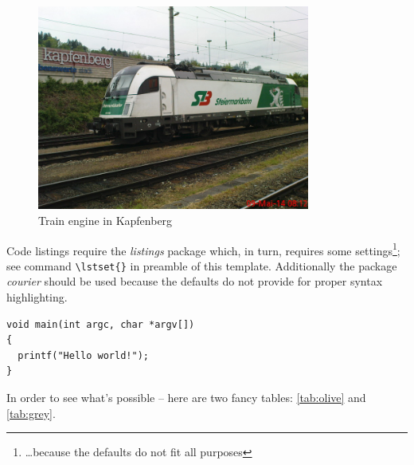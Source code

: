 \begin{figure}[h]
\centering
\includegraphics[keepaspectratio,width=0.8\textwidth]
{images/engine}
\caption{Train engine in Kapfenberg}
\label{fig:engine}
\end{figure}

Code listings require the \textit{listings} package which, in turn, requires some settings\footnote{\ldots because the defaults do not fit all purposes}; see command \verb+\lstset{}+ in preamble of this template. Additionally the package \textit{courier} should be used because the defaults do not provide for proper syntax highlighting.

\lstset{caption=Main programme, basicstyle=\small\ttfamily, label=lst:main, language=C}
\begin{lstlisting}
void main(int argc, char *argv[])
{
  printf("Hello world!");
}
\end{lstlisting}

In order to see what's possible -- here are two fancy tables: \ref{tab:olive} and \ref{tab:grey}.

